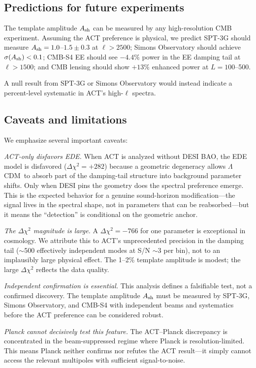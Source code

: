 \documentclass[onecolumn,showpacs,preprintnumbers,amsmath,amssymb,prd]{revtex4-2}
\newcommand{\lcdm}{$\Lambda$CDM}
\begin{document}
\subsection{Predictions for future experiments}

The template amplitude $A_{\rm sh}$ can be measured by any high-resolution 
CMB experiment. Assuming the ACT preference is physical, we predict SPT-3G should measure $A_{\rm sh} = 1.0$--$1.5 \pm 0.3$ at $\ell > 2500$; Simons Observatory should achieve $\sigma(A_{\rm sh}) < 0.1$; CMB-S4 EE should see $-4.4\%$ power in the EE damping tail at $\ell > 1500$; and CMB lensing should show $+13\%$ enhanced power at $L = 100$--500.

A null result from SPT-3G or Simons Observatory would instead indicate 
a percent-level systematic in ACT's high-$\ell$ spectra.

\subsection{Caveats and limitations}

We emphasize several important caveats:

\emph{ACT-only disfavors EDE.} When ACT is analyzed without DESI BAO, the 
EDE model is disfavored ($\Delta\chi^2 = +282$) because a geometric degeneracy 
allows \lcdm\ to absorb part of the damping-tail structure into background 
parameter shifts. Only when DESI pins the geometry does the spectral preference 
emerge. This is the expected behavior for a genuine sound-horizon modification---the 
signal lives in the spectral shape, not in parameters that can be reabsorbed---but 
it means the ``detection'' is conditional on the geometric anchor.

\emph{The $\Delta\chi^2$ magnitude is large.} A $\Delta\chi^2 = -766$ for one 
parameter is exceptional in cosmology. We attribute this to ACT's unprecedented 
precision in the damping tail ($\sim$500 effectively independent modes at S/N 
$\sim 3$ per bin), not to an implausibly large physical effect. The 1--2\% 
template amplitude is modest; the large $\Delta\chi^2$ reflects the data quality.

\emph{Independent confirmation is essential.} This analysis defines a falsifiable 
test, not a confirmed discovery. The template amplitude $A_{\rm sh}$ must be 
measured by SPT-3G, Simons Observatory, and CMB-S4 with independent beams and 
systematics before the ACT preference can be considered robust.

\emph{Planck cannot decisively test this feature.} The ACT--Planck discrepancy 
is concentrated in the beam-suppressed regime where Planck is resolution-limited. 
This means Planck neither confirms nor refutes the ACT result---it simply cannot 
access the relevant multipoles with sufficient signal-to-noise.
\end{document}
